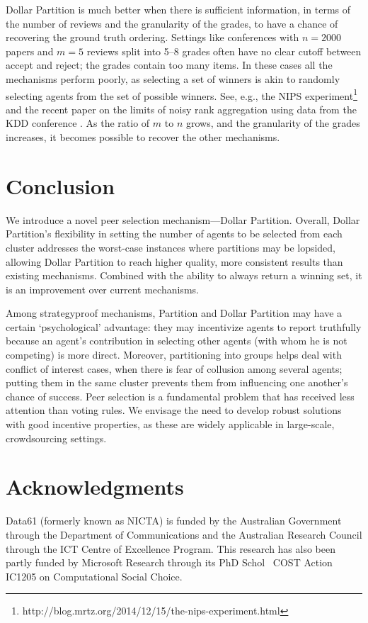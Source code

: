 \documentclass[letterpaper]{article}
\begin{document}
Dollar Partition is much better when there is sufficient information, in terms of the number of reviews and the granularity of the grades, to have a chance of recovering the ground truth ordering. Settings like conferences with $n=2000$ papers and $m=5$ reviews split into 5--8 grades often have no clear cutoff between accept and reject; the grades contain too many items. In these cases all the mechanisms perform poorly, as selecting a set of winners is akin to randomly selecting agents from the set of possible winners. See, e.g., the NIPS experiment\footnote{http://blog.mrtz.org/2014/12/15/the-nips-experiment.html} and the recent paper on the limits of noisy rank aggregation using data from the KDD conference \cite{JoRa15a}. As the ratio of $m$ to $n$ grows, and the granularity of the grades increases, it becomes possible to recover  the other mechanisms.







\section{Conclusion}

We introduce a novel peer selection mechanism---Dollar Partition.
Overall, Dollar Partition's flexibility in setting the number of agents to be selected from each cluster addresses the worst-case instances where partitions may be lopsided, allowing Dollar Partition to reach higher quality, more consistent results than existing mechanisms. Combined with the ability to always return a winning set, it is an improvement over current mechanisms.

Among strategyproof mechanisms, Partition and Dollar Partition may
have a certain `psychological' advantage: they may incentivize agents to report truthfully because an agent's contribution in selecting other agents (with whom he is not competing) is more direct.
Moreover, partitioning into groups helps deal with conflict of interest cases, when there is fear of collusion among several agents; putting them in the same cluster prevents them from influencing one another's chance of success.
Peer selection is a fundamental problem that has received less attention than voting rules.  We envisage the need to develop robust solutions with good incentive properties, as these are widely applicable in large-scale, crowdsourcing settings.

\section{Acknowledgments}
Data61 (formerly known as NICTA) is funded by the Australian Government through the Department of Communications and the Australian Research Council through the ICT Centre of Excellence Program. This research has also been partly funded by Microsoft Research through its PhD Schol \ COST Action IC1205 on Computational Social Choice.
\end{document}
